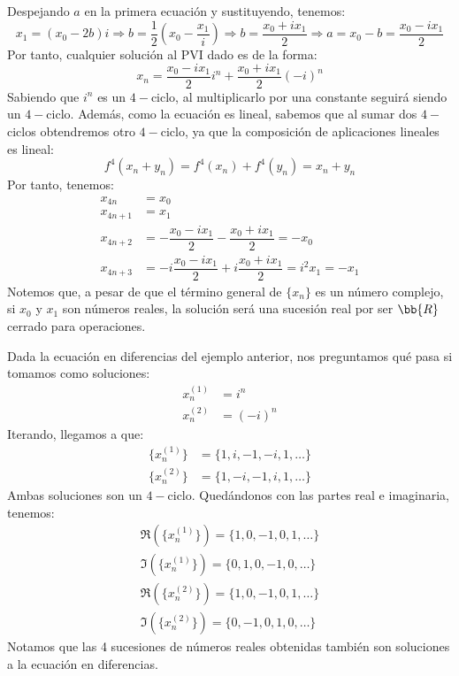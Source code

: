 \begin{ejemplo}
    Despejando $a$ en la primera ecuación y sustituyendo, tenemos:
    \begin{equation*}
        x_1 = (x_0-2b)i \Longrightarrow
        b = \frac{1}{2}\left(x_0-\frac{x_1}{i}\right)
        \Longrightarrow
        b=\frac{x_0+ix_1}{2}
        \Longrightarrow
        a = x_0-b = \frac{x_0-ix_1}{2}
    \end{equation*}
    Por tanto, cualquier solución al PVI dado es de la forma:
    \begin{equation*}
        x_n = \dfrac{x_0 - ix_1}{2}i^n + \dfrac{x_0 + ix_1}{2}{(-i)}^n
    \end{equation*}
    Sabiendo que $i^n$ es un $4-$ciclo, al multiplicarlo por una constante seguirá siendo un $4-$ciclo. Además, como la ecuación es lineal, sabemos que al sumar dos $4-$ciclos obtendremos otro $4-$ciclo, ya que la composición de aplicaciones lineales es lineal:
    \begin{equation*}
        f^4(x_n + y_n) = f^4(x_n) + f^4(y_n) = x_n + y_n
    \end{equation*}
    Por tanto, tenemos:
    \begin{align*}
        x_{4n} &= x_0\\
        x_{4n+1} &= x_1\\
        x_{4n+2} &= -\dfrac{x_0 - ix_1}{2} - \dfrac{x_0 + ix_1}{2}
        = -x_0 \\
        x_{4n+3} &= -i\dfrac{x_0 - ix_1}{2} +i \dfrac{x_0 + ix_1}{2} = i^2x_1 = -x_1
    \end{align*}  
    Notemos que, a pesar de que el término general de $\{x_n\}$ es un número complejo, si $x_0$ y $x_1$ son números reales, la solución será una sucesión real por ser $\bb{R}$ cerrado para operaciones.
\end{ejemplo}

\begin{ejemplo}
    Dada la ecuación en diferencias del ejemplo anterior, nos preguntamos qué pasa si tomamos como soluciones:
    \begin{align*}
        x_n^{(1)} &= i^n \\
        x_n^{(2)} &= {(-i)}^n
    \end{align*}
    Iterando, llegamos a que:
    \begin{align*}
        \{x_n^{(1)}\} &= \{1, i, -1, -i, 1, \ldots \} \\
        \{x_n^{(2)}\} &= \{1, -i, -1, i, 1, \ldots \}
    \end{align*}
    Ambas soluciones son un $4-$ciclo. Quedándonos con las partes real e imaginaria, tenemos:
    \begin{align*}
        \Re(\{x_n^{(1)}\}) = \{1, 0, -1, 0, 1, \ldots \} \\
        \Im(\{x_n^{(1)}\}) = \{0, 1, 0, -1, 0, \ldots \} \\
        \Re(\{x_n^{(2)}\}) = \{1, 0, -1, 0, 1, \ldots \} \\
        \Im(\{x_n^{(2)}\}) = \{0, -1, 0, 1, 0, \ldots \} 
    \end{align*}
    Notamos que las 4 sucesiones de números reales obtenidas también son soluciones a la ecuación en diferencias.
\end{ejemplo}

